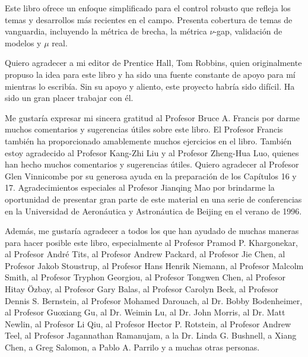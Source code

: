 \documentclass[
	spanish, %
	letterpaper, oneside
]{book}
\begin{document}
\begin{dedicatory}
	Este libro ofrece un enfoque simplificado para el control robusto que refleja los temas y desarrollos más recientes en el campo. Presenta cobertura de temas de vanguardia, incluyendo la métrica de brecha, la métrica $\nu$-gap, validación de modelos y $\mu$ real.

	Quiero agradecer a mi editor de Prentice Hall, Tom Robbins, quien originalmente propuso la idea para este libro y ha sido una fuente constante de apoyo para mí mientras lo escribía. Sin su apoyo y aliento, este proyecto habría sido difícil. Ha sido un gran placer trabajar con él.

	Me gustaría expresar mi sincera gratitud al Profesor Bruce A. Francis por darme muchos comentarios y sugerencias útiles sobre este libro. El Profesor Francis también ha proporcionado amablemente muchos ejercicios en el libro. También estoy agradecido al Profesor Kang-Zhi Liu y al Profesor Zheng-Hua Luo, quienes han hecho muchos comentarios y sugerencias útiles. Quiero agradecer al Profesor Glen Vinnicombe por su generosa ayuda en la preparación de los Capítulos 16 y 17. Agradecimientos especiales al Profesor Jianqing Mao por brindarme la oportunidad de presentar gran parte de este material en una serie de conferencias en la Universidad de Aeronáutica y Astronáutica de Beijing en el verano de 1996.

	Además, me gustaría agradecer a todos los que han ayudado de muchas maneras para hacer posible este libro, especialmente al Profesor Pramod P. Khargonekar, al Profesor André Tits, al Profesor Andrew Packard, al Profesor Jie Chen, al Profesor Jakob Stoustrup, al Profesor Hans Henrik Niemann, al Profesor Malcolm Smith, al Profesor Tryphon Georgiou, al Profesor Tongwen Chen, al Profesor Hitay Özbay, al Profesor Gary Balas, al Profesor Carolyn Beck, al Profesor Dennis S. Bernstein, al Profesor Mohamed Darouach, al Dr. Bobby Bodenheimer, al Profesor Guoxiang Gu, al Dr. Weimin Lu, al Dr. John Morris, al Dr. Matt Newlin, al Profesor Li Qiu, al Profesor Hector P. Rotstein, al Profesor Andrew Teel, al Profesor Jagannathan Ramanujam, a la Dr. Linda G. Bushnell, a Xiang Chen, a Greg Salomon, a Pablo A. Parrilo y a muchas otras personas.


\end{dedicatory}
\end{document}
